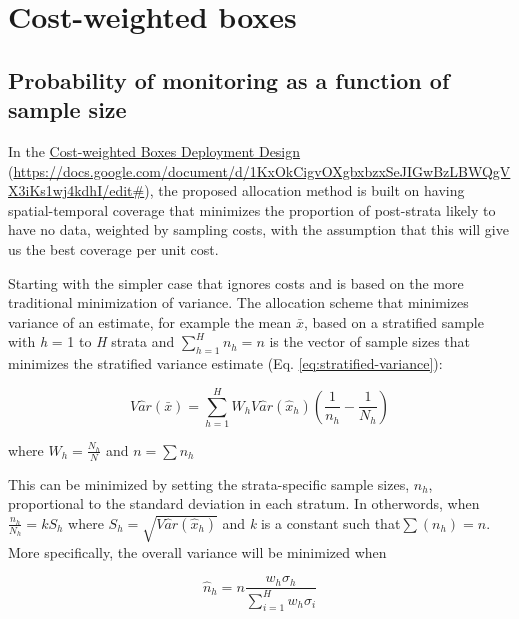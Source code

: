\documentclass[
]{article}
\begin{document}
\hypertarget{cost-weighted-boxes}{%
\section{Cost-weighted boxes}\label{cost-weighted-boxes}}

\hypertarget{probability-of-monitoring-as-a-function-of-sample-size}{%
\subsection{Probability of monitoring as a function of sample size}\label{probability-of-monitoring-as-a-function-of-sample-size}}

In the
\href{https://docs.google.com/document/d/1KxOkCigvOXgbxbzxSeJIGwBzLBWQgVX3iKs1wj4kdhI/edit\#}{Cost-weighted Boxes Deployment
Design}
(\url{https://docs.google.com/document/d/1KxOkCigvOXgbxbzxSeJIGwBzLBWQgVX3iKs1wj4kdhI/edit\#}),
the proposed allocation method is built on having spatial-temporal coverage that
minimizes the proportion of post-strata likely to have no data, weighted by
sampling costs, with the assumption that this will give us the best coverage per
unit cost.

Starting with the simpler case that ignores costs and is based on the more
traditional minimization of variance. The allocation scheme that minimizes
variance of an estimate, for example the mean \(\bar{x}\), based on a stratified
sample with \emph{h} = 1 to \emph{H} strata and \(\sum_{h=1}^{H}n_h = n\) is the vector of
sample sizes that minimizes the stratified variance estimate (Eq. \eqref{eq:stratified-variance}):

\begin{equation} 
  V\hat{a}r(\bar{x}) = \sum_{h = 1}^{H}
W_h V\hat{a}r(\hat{x}_{h})\left(\frac{1}{n_h} - \frac{1}{N_h}\right)  
 \label{eq:stratified-variance} 
\end{equation}

where \(W_h = \frac{N_h}{N}\) and \(n= \sum{n_h}\)

This can be minimized by setting the strata-specific sample sizes,
\(n_h\), proportional to the standard deviation in each stratum. In
otherwords, when \(\frac{n_h}{N_h} = kS_h\) where
\(S_h = \sqrt{V\hat{a}r(\hat{x}_{h})}\) and \emph{k} is a constant such
that\(\sum(n_h) = n\). More specifically, the overall variance will be
minimized when

\begin{equation}  
  \hat{n}_{h} = n \frac{w_{h} \sigma_{h}}{\sum_{i = 1}^{H} w_{h} \sigma_i}
  \label{eq:Neyman-sample-size} 
\end{equation}
\end{document}
